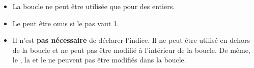 	\begin{itemize}
	\item
		La boucle  ne peut être utilisée que pour des entiers.
	\item
		Le  peut être omis si le pas vaut 1.
	\item
		Il n'est \textbf{pas nécessaire} de déclarer l'indice.
		Il ne peut être utilisé en dehors de la boucle et ne peut pas
		être modifié à l'intérieur de la boucle.
		De même, le , la  et le  
		ne peuvent pas être modifiés dans la boucle.
	\end{itemize}
	

